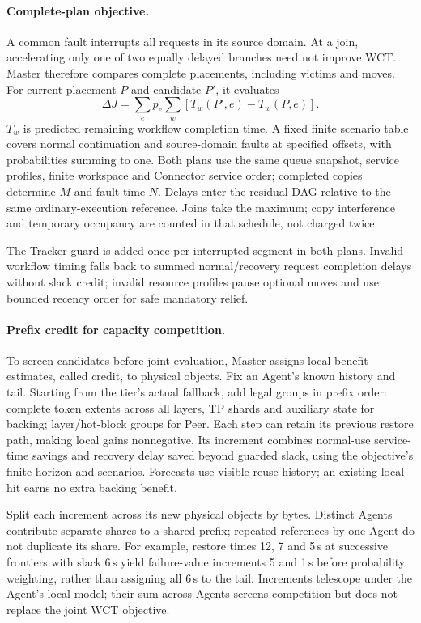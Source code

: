 \paragraph{Complete-plan objective.}
A common fault interrupts all requests in its source domain. At a join,
accelerating only one of two equally delayed branches need not improve
WCT. Master therefore compares complete placements, including victims
and moves. For current placement $P$ and candidate $P'$, it evaluates
\begin{equation}
 \Delta J=\sum_e p_e\sum_w[T_w(P',e)-T_w(P,e)].
 \label{eq:value}
\end{equation}
$T_w$ is predicted remaining workflow completion time. A fixed finite
scenario table covers normal continuation and source-domain faults at
specified offsets, with probabilities summing to one. Both plans use
the same queue snapshot, service profiles, finite workspace and Connector
service order; completed copies determine $M$ and fault-time $N$.
Delays enter the residual DAG relative to the same ordinary-execution
reference. Joins take the maximum; copy interference and temporary
occupancy are counted in that schedule, not charged twice.

The Tracker guard is added once per interrupted segment in both plans.
Invalid workflow timing falls back to summed normal/recovery request
completion delays without slack credit; invalid resource profiles pause
optional moves and use bounded recency order for safe mandatory relief.

\paragraph{Prefix credit for capacity competition.}
To screen candidates before joint evaluation, Master assigns local
benefit estimates, called credit, to physical objects. Fix an Agent's
known history and tail. Starting from the tier's actual fallback, add
legal groups in prefix order: complete token extents across all layers,
TP shards and auxiliary state for backing; layer/hot-block groups for
Peer. Each step can retain its previous restore path, making local gains
nonnegative. Its increment combines normal-use service-time savings and
recovery delay saved beyond guarded slack, using the objective's finite
horizon and scenarios. Forecasts use visible reuse history; an existing
local hit earns no extra backing benefit.

Split each increment across its new physical objects by bytes. Distinct
Agents contribute separate shares to a shared prefix; repeated references
by one Agent do not duplicate its share. For example, restore times
12, 7 and 5\,s at successive frontiers with slack 6\,s yield failure-value
increments 5 and 1\,s before probability weighting, rather than assigning
all 6\,s to the tail. Increments telescope under the Agent's local model;
their sum across Agents screens competition but does not replace the
joint WCT objective.

